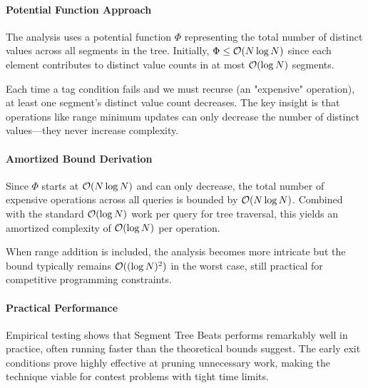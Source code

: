 \paragraph{Potential Function Approach}

The analysis uses a potential function $\Phi$ representing the total number of distinct values across all segments in the tree. Initially, $\Phi \leq \mathcal{O}(N \log N)$ since each element contributes to distinct value counts in at most $\mathcal{O}(\log N)$ segments.

Each time a tag condition fails and we must recurse (an "expensive" operation), at least one segment's distinct value count decreases. The key insight is that operations like range minimum updates can only decrease the number of distinct values—they never increase complexity.


\paragraph{Amortized Bound Derivation}

Since $\Phi$ starts at $\mathcal{O}(N \log N)$ and can only decrease, the total number of expensive operations across all queries is bounded by $\mathcal{O}(N \log N)$. Combined with the standard $\mathcal{O}(\log N)$ work per query for tree traversal, this yields an amortized complexity of $\mathcal{O}(\log N)$ per operation.

When range addition is included, the analysis becomes more intricate but the bound typically remains $\mathcal{O}((\log N)^2)$ in the worst case, still practical for competitive programming constraints.

\paragraph{Practical Performance}

Empirical testing shows that Segment Tree Beats performs remarkably well in practice, often running faster than the theoretical bounds suggest. The early exit conditions prove highly effective at pruning unnecessary work, making the technique viable for contest problems with tight time limits.

